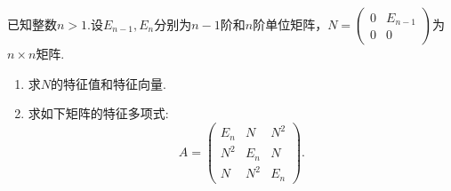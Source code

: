 \documentclass[../../main.tex]{subfiles}
\begin{document}
\begin{example}
已知整数$n > 1$.设$E_{n - 1}, E_n$分别为$n - 1$阶和$n$阶单位矩阵，$N = \begin{pmatrix} 0 & E_{n - 1} \\ 0 & 0 \end{pmatrix}$为$n \times n$矩阵.
\begin{enumerate}[(1)]
\item 求$N$的特征值和特征向量.

\item 求如下矩阵的特征多项式:
\[
A = \begin{pmatrix} E_n & N & N^2 \\ N^2 & E_n & N \\ N & N^2 & E_n \end{pmatrix}.
\]
\end{enumerate}
\end{example}
\end{document}
